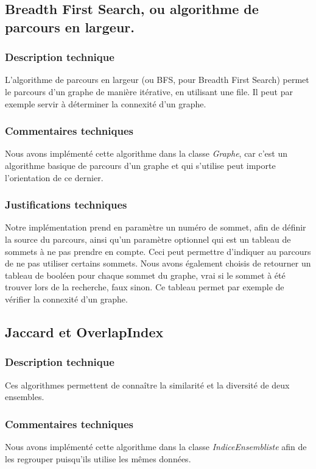 \begin{titlepage}
\vspace{1cm}
{

\subsection{Breadth First Search, ou algorithme de parcours en largeur.}
\subsubsection{Description technique}
{
L'algorithme de parcours en largeur (ou BFS, pour Breadth First Search) permet le parcours d'un graphe de manière itérative, en utilisant une file. Il peut par exemple servir à déterminer la connexité d'un graphe.
}
\subsubsection{Commentaires techniques}
{
Nous avons implémenté cette algorithme dans la classe \textit{Graphe}, car c'est un algorithme basique de parcours d'un graphe et qui s'utilise peut importe l'orientation de ce dernier.
}
\subsubsection{Justifications techniques}
{
Notre implémentation prend en paramètre un numéro de sommet, afin de définir la source du parcours, ainsi qu'un paramètre optionnel qui est un tableau de sommets à ne pas prendre en compte. Ceci peut permettre d'indiquer au parcours de ne pas utiliser certains sommets. Nous avons également choisis de retourner un tableau de booléen pour chaque sommet du graphe, vrai si le sommet à été trouver lors de la recherche, faux sinon. Ce tableau permet par exemple de vérifier la connexité d'un graphe.
}

\subsection{Jaccard et OverlapIndex}
\subsubsection{Description technique}
{
Ces algorithmes permettent de connaître la similarité et la diversité de deux ensembles.
}
\subsubsection{Commentaires techniques}
{
Nous avons implémenté cette algorithme dans la classe \textit{IndiceEnsembliste} afin de les regrouper puisqu'ils utilise les mêmes données.
}
}
\end{titlepage}
